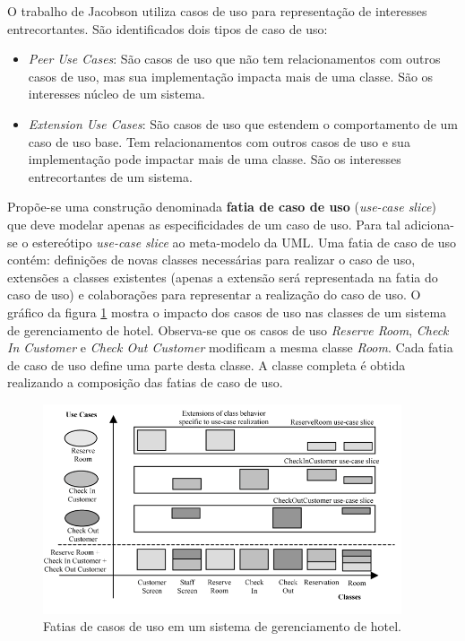 O trabalho de Jacobson \cite{Jacobson:2004:ASD:1062430} utiliza casos de uso para representação de interesses entrecortantes. São identificados dois
tipos de caso de uso:

\begin{itemize}
  \item \textit{Peer Use Cases}: São casos de uso que não tem relacionamentos com outros casos de uso, mas sua implementação impacta mais de uma
  classe. São os interesses núcleo de um sistema.
  \item \textit{Extension Use Cases}: São casos de uso que estendem o comportamento de um caso de uso base. Tem relacionamentos com outros casos de
  uso e sua implementação pode impactar mais de uma classe. São os interesses entrecortantes de um sistema.
\end{itemize}

Propõe-se uma construção denominada \textbf{fatia de caso de uso} (\textit{use-case slice}) que deve modelar apenas as especificidades de um 
caso de uso. Para tal adiciona-se o estereótipo \textit{use-case slice} ao meta-modelo da UML. Uma fatia de caso de uso contém: definições de novas
classes necessárias para realizar o caso de uso, extensões a classes existentes (apenas a extensão será representada na fatia do caso de uso) e
colaborações para representar a realização do caso de uso. O gráfico da figura \ref{fig:jacobson_slices} mostra o impacto dos casos de uso nas classes
de um sistema de gerenciamento de hotel. Observa-se que os casos de uso \textit{Reserve Room}, \textit{Check In Customer} e \textit{Check Out
Customer} modificam a mesma classe \textit{Room}. Cada fatia de caso de uso define uma parte desta classe. A classe completa é obtida realizando a
composição das fatias de caso de uso. 

\begin{figure}
	\centering
	\includegraphics[width=400px]{img/jacobson_slices.png}
	\caption{Fatias de casos de uso em um sistema de
	gerenciamento de hotel.}\label{fig:jacobson_slices}
\end{figure}

